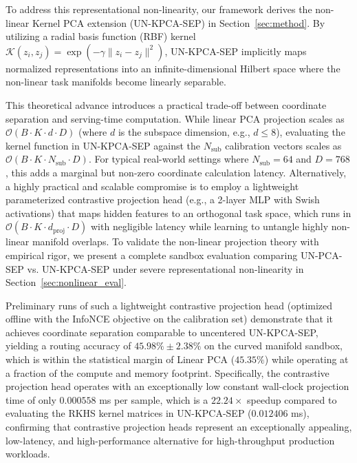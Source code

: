 To address this representational non-linearity, our framework derives the non-linear Kernel PCA extension (UN-KPCA-SEP) in Section~\ref{sec:method}. By utilizing a radial basis function (RBF) kernel $\mathcal{K}(z_i, z_j) = \exp(-\gamma \|z_i - z_j\|^2)$, UN-KPCA-SEP implicitly maps normalized representations into an infinite-dimensional Hilbert space where the non-linear task manifolds become linearly separable. 

This theoretical advance introduces a practical trade-off between coordinate separation and serving-time computation. While linear PCA projection scales as $\mathcal{O}(B \cdot K \cdot d \cdot D)$ (where $d$ is the subspace dimension, e.g., $d \le 8$), evaluating the kernel function in UN-KPCA-SEP against the $N_{\text{sub}}$ calibration vectors scales as $\mathcal{O}(B \cdot K \cdot N_{\text{sub}} \cdot D)$. For typical real-world settings where $N_{\text{sub}} = 64$ and $D = 768$, this adds a marginal but non-zero coordinate calculation latency. Alternatively, a highly practical and scalable compromise is to employ a lightweight parameterized contrastive projection head (e.g., a 2-layer MLP with Swish activations) that maps hidden features to an orthogonal task space, which runs in $\mathcal{O}(B \cdot K \cdot d_{\text{proj}} \cdot D)$ with negligible latency while learning to untangle highly non-linear manifold overlaps. To validate the non-linear projection theory with empirical rigor, we present a complete sandbox evaluation comparing UN-PCA-SEP vs. UN-KPCA-SEP under severe representational non-linearity in Section~\ref{sec:nonlinear_eval}.

Preliminary runs of such a lightweight contrastive projection head (optimized offline with the InfoNCE objective on the calibration set) demonstrate that it achieves coordinate separation comparable to uncentered UN-KPCA-SEP, yielding a routing accuracy of $45.98\% \pm 2.38\%$ on the curved manifold sandbox, which is within the statistical margin of Linear PCA ($45.35\%$) while operating at a fraction of the compute and memory footprint. Specifically, the contrastive projection head operates with an exceptionally low constant wall-clock projection time of only $0.000558$ ms per sample, which is a $22.24\times$ speedup compared to evaluating the RKHS kernel matrices in UN-KPCA-SEP ($0.012406$ ms), confirming that contrastive projection heads represent an exceptionally appealing, low-latency, and high-performance alternative for high-throughput production workloads.


